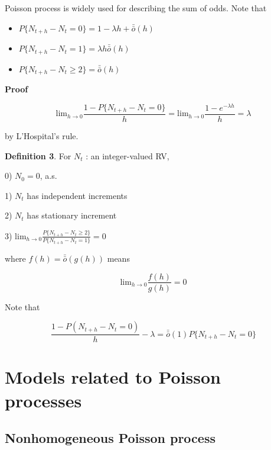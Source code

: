 \documentclass[12pt]{article}
\theoremstyle{nonumberbreak}
\begin{document}
Poisson process is widely used for describing the sum of odds. Note that


\begin{theorem}
\begin{itemize}
	\item $P\{ N_{t+h} - N_t = 0 \} = 1 - \lambda h + \bar{\bar{o}}(h)$
	\item $P\{ N_{t+h} - N_t = 1 \} = \lambda h \bar{\bar{o}}(h)$
	\item $P\{ N_{t+h} - N_t \ge 2 \} = \bar{\bar{o}}(h)$
\end{itemize}
\end{theorem}

\textbf{Proof} 

$$
\mathrm{lim}_{h \to 0} \frac{1 - P\{ N_{t+h} - N_t = 0 \}}{h} = \mathrm{lim}_{h \to 0} \frac{1-e^{-\lambda h}}{h} = \lambda
$$

by L'Hospital's rule.


\begin{theorem}
\textbf{Definition 3}. For $N_t$ : an integer-valued RV,
	\item 0) $N_0 = 0$, a.s.
	\item 1) $N_t$ has independent increments
	\item 2) $N_t$ has stationary increment 
	\item 3) $\mathrm{lim}_{h \to 0} \frac{P\{ N_{t+h} - N_t \ge 2 \}}{P\{ N_{t+h} - N_t = 1 \}} = 0 $
\end{theorem}


where $f(h) = \bar{\bar{o}} (g(h))$ means

$$
\mathrm{lim}_{h\to0} \frac{f(h)}{g(h)} = 0
$$ 

Note that 

$$
\frac{1 - P(N_{t+h} - N_t = 0) }{h} - \lambda = \bar{\bar{o}} (1) P\{ N_{t+h} - N_t = 0 \}
$$



\pagebreak
\section{Models related to Poisson processes}

\subsection{Nonhomogeneous Poisson process}
\end{document}
